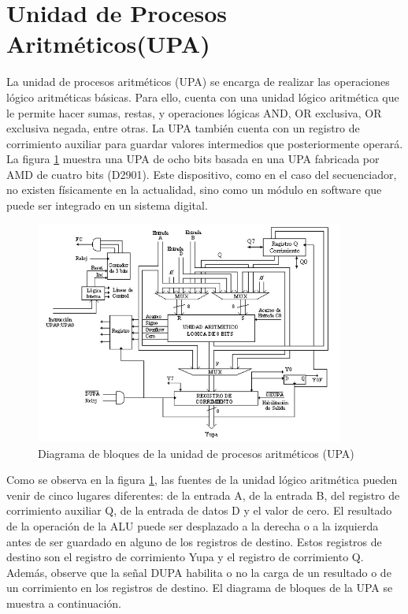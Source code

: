 \documentclass[12pt]{book}
\theoremstyle{definition}
\theoremstyle{remark}
\theoremstyle{plain}
\begin{document}
\section{Unidad de Procesos Aritméticos(UPA)}


La unidad de procesos aritméticos (UPA) se encarga de realizar las operaciones lógico
aritméticas básicas. Para ello, cuenta con una unidad lógico aritmética que le permite hacer sumas,
restas, y operaciones lógicas AND, OR exclusiva, OR exclusiva negada, entre otras. La UPA
también cuenta con un registro de corrimiento auxiliar para guardar valores intermedios que
posteriormente operará.
La figura \ref{fig31} muestra una UPA de ocho bits basada en una UPA fabricada por AMD de cuatro
bits (D2901). Este dispositivo, como en el caso del secuenciador, no existen físicamente en la
actualidad, sino como un módulo en software que puede ser integrado en un sistema digital.


\begin{figure}
\centering
\includegraphics[width=4in]{ALU.jpg}
\caption{Diagrama de bloques de la unidad de procesos aritméticos (UPA)}
\label{fig31}
\end{figure}


Como se observa en la figura \ref{fig31}, las fuentes de la unidad lógico aritmética pueden venir de
cinco lugares diferentes: de la entrada A, de la entrada B, del registro de corrimiento auxiliar Q, de
la entrada de datos D y el valor de cero.
El resultado de la operación de la ALU puede ser desplazado a la derecha o a la izquierda antes
de ser guardado en alguno de los registros de destino. Estos registros de destino son el registro de
corrimiento Yupa y el registro de corrimiento Q. Además, observe que la señal DUPA habilita o no
la carga de un resultado o de un corrimiento en los registros de destino.
El diagrama de bloques de la UPA se muestra a continuación.
\end{document}
